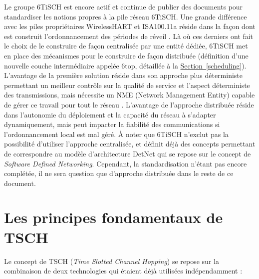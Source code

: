 \documentclass[]{report}
\newcommand{\wordlink}[2]{\hyperref[#2]{#1~\ref{#2}}}
\begin{document}
Le groupe 6TiSCH est encore actif et continue de publier des documents pour standardiser les notions propres à la pile réseau 6TiSCH. Une grande différence avec les piles propriétaires WirelessHART et ISA100.11a réside dans la façon dont est construit l'ordonnancement des périodes de réveil \cite{SODA}. Là où ces derniers ont fait le choix de le construire de façon centralisée par une entité dédiée, 6TiSCH met en place des mécanismes pour le construire de façon distribuée (définition d'une nouvelle couche intermédiaire appelée 6top, détaillée à la \wordlink{Section}{scheduling}). L'avantage de la première solution réside dans son approche plus déterministe permettant un meilleur contrôle sur la qualité de service et l'aspect déterministe des transmissions, mais nécessite un NME (Network Management Entity) capable de gérer ce travail pour tout le réseau \cite{ietf-6tisch-architecture-28}. L'avantage de l'approche distribuée réside dans l'autonomie du déploiement et la capacité du réseau à s'adapter dynamiquement, mais peut impacter la fiabilité des communications si l'ordonnancement local est mal géré. À noter que 6TiSCH n'exclut pas la possibilité d'utiliser l'approche centralisée, et définit déjà des concepts permettant de correspondre au modèle d'architecture DetNet \cite{ietf-6tisch-architecture-28} qui se repose sur le concept de \textit{Software Defined Networking}. Cependant, la standardisation n'étant pas encore complétée, il ne sera question que d'approche distribuée dans le reste de ce document.

\newpage

\section{Les principes fondamentaux de TSCH}
\label{tschfond}

Le concept de TSCH (\textit{Time Slotted Channel Hopping}) se repose sur la combinaison de deux technologies qui étaient déjà utilisées indépendamment :\\
\end{document}
